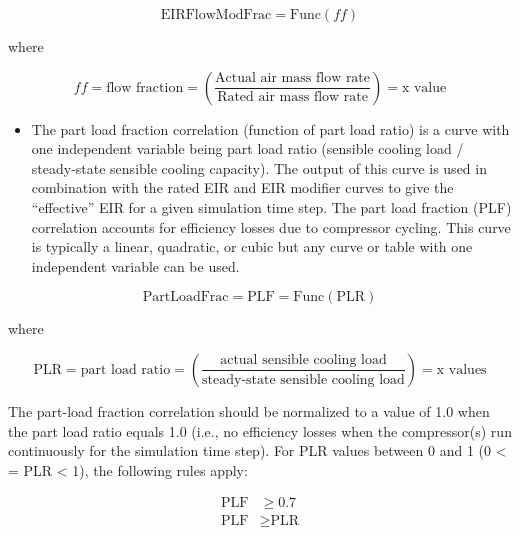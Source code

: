 \begin{equation}
\text{EIRFlowModFrac} = \text{Func}\left(ff\right)
\end{equation}

where

\begin{equation}
ff = \text{flow fraction} = \left( \frac{\text{Actual air mass flow rate}}{\text{Rated air mass flow rate}} \right) = \text{x value}
\end{equation}

\begin{itemize}
\tightlist
\item
  The part load fraction correlation (function of part load ratio) is a curve with one independent variable being part load ratio (sensible cooling load / steady-state sensible cooling capacity). The output of this curve is used in combination with the rated EIR and EIR modifier curves to give the ``effective'' EIR for a given simulation time step. The part load fraction (PLF) correlation accounts for efficiency losses due to compressor cycling. This curve is typically a linear, quadratic, or cubic but any curve or table with one independent variable can be used.
\end{itemize}

\begin{equation}
\text{PartLoadFrac} = \text{PLF} = \text{Func}\left(\text{PLR}\right)
\end{equation}

where

\begin{equation}
\text{PLR} = \text{part load ratio} = \left(\frac{\text{actual sensible cooling load}}{\text{steady-state sensible cooling load}}\right) = \text{x values}
\end{equation}

The part-load fraction correlation should be normalized to a value of 1.0 when the part load ratio equals 1.0 (i.e., no efficiency losses when the compressor(s) run continuously for the simulation time step). For PLR values between 0 and 1 (0 \textless{} = PLR \textless{} 1), the following rules apply:

\begin{equation}
  \begin{array}{rl}
    \text{PLF} &\geq 0.7 \\
    \text{PLF} &\geq \text{PLR}
  \end{array}
\end{equation}

